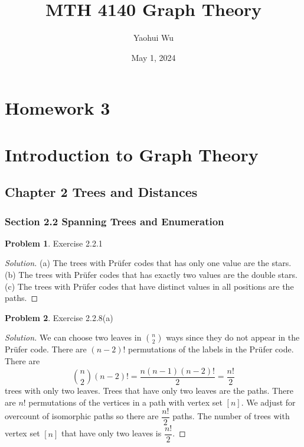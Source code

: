\documentclass[12pt]{article}
\title{MTH 4140 Graph Theory}
\author{Yaohui Wu}
\date{May 1, 2024}
\theoremstyle{definition}
\newtheorem{problem}{Problem}
\newenvironment*{solution}{\begin{proof}[Solution]}{\end{proof}}
\begin{document}
\maketitle
\section*{Homework 3}
\section*{Introduction to Graph Theory}

\subsection*{Chapter 2 Trees and Distances}
\subsubsection*{Section 2.2 Spanning Trees and Enumeration}
\begin{problem}
    Exercise 2.2.1
\end{problem}
\begin{solution}
    (a) The trees with Prüfer codes that has only one value are the stars. (b)
    The trees with Prüfer codes that has exactly two values are the double
    stars. (c) The trees with Prüfer codes that have distinct values in all
    positions are the paths.
\end{solution}
\begin{problem}
    Exercise 2.2.8(a)
\end{problem}
\begin{solution}
    We can choose two leaves in \(\binom{n}{2}\) ways since they do not appear
    in the Prüfer code. There are \((n-2)!\) permutations of the labels in the
    Prüfer code. There are
    \[\binom{n}{2}(n-2)! = \frac{n(n-1)(n-2)!}{2} = \frac{n!}{2}\]
    trees with only two leaves. Trees that have only two leaves are
    the paths. There are \(n!\) permutations of the vertices in a path with
    vertex set \([n]\). We adjust for overcount of isomorphic paths so there
    are \(\dfrac{n!}{2}\) paths. The number of trees with vertex set \([n]\)
    that have only two leaves is \(\dfrac{n!}{2}\).
\end{solution}
\end{document}
